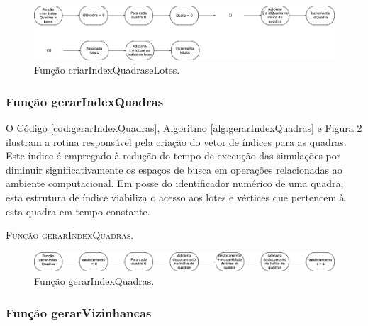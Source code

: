\begin{figure}[H]
  \centering
  \includegraphics[width=1\textwidth]{Figuras/Simula/Fluxos/criarIndexQuadraseLotes.eps}
  \caption{Função criarIndexQuadraseLotes.}
  \label{fig:criarIndexQuadraseLotes}
\end{figure} 

\newpage

\subsubsection{Função gerarIndexQuadras}

O Código \ref{cod:gerarIndexQuadras}, Algoritmo \ref{alg:gerarIndexQuadras} e Figura \ref{fig:gerarIndexQuadras} ilustram a rotina responsável pela criação do vetor de índices para as quadras. Este índice é empregado à redução do tempo de execução das simulações por diminuir significativamente os espaços de busca em operações relacionadas ao ambiente computacional. Em posse do identificador numérico de uma quadra, esta estrutura de índice viabiliza o acesso aos lotes e vértices que pertencem à esta quadra em tempo constante. 



\begin{algorithm}[H]
   \SetAlgoLined   
   
   \caption{\textsc{Função gerarIndexQuadras.}}
   \label{alg:gerarIndexQuadras}
\end{algorithm}

\begin{figure}[H]
  \centering
  \includegraphics[width=1\textwidth]{Figuras/Simula/Fluxos/gerarIndexQuadras.eps}
  \caption{Função gerarIndexQuadras.}
  \label{fig:gerarIndexQuadras}
\end{figure} 

\newpage

\subsubsection{Função gerarVizinhancas}

